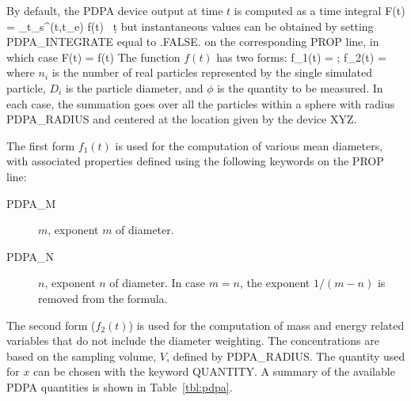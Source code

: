 \documentclass[11pt]{book}
\begin{document}
By default, the PDPA device output at time $t$ is computed as a time integral
\be
F(t) =  \int_{t_{\rm s}}^{\min(t,t_{\rm e})} f(t) \, \d t
\ee
but instantaneous values can be obtained by setting {\ct PDPA\_INTEGRATE} equal to {\ct .FALSE.} on the corresponding {\ct PROP} line, in which case
\be
F(t) = f(t)
\ee
The function $f(t)$ has two forms:
\be
f_1(t) =    \quad ; \quad
f_2(t) = 
\ee
where $n_i$ is the number of real particles represented by the single simulated particle, $D_i$
is the particle diameter, and $\phi$ is the quantity to be measured. In each case, the summation goes over all the particles within a sphere
with radius {\ct PDPA\_RADIUS} and centered at the location given by the device {\ct XYZ}.

The first form $f_1(t)$ is used for the computation of various mean diameters, with
associated properties defined using the following keywords on the {\ct PROP} line:
\begin{description}
\item[{\ct PDPA\_M}] $m$, exponent $m$ of diameter.
\item[{\ct PDPA\_N}] $n$, exponent $n$ of diameter. In case $m=n$, the exponent $1/(m-n)$ is removed from the formula.
\end{description}
The second form ($f_2(t)$) is used for the computation of mass and energy related variables that do not include the diameter weighting.
The concentrations are based on the sampling volume, $V$, defined by {\ct PDPA\_RADIUS}.
The quantity used for $x$ can be chosen with the keyword {\ct QUANTITY}.
A summary of the available PDPA quantities is shown in Table~\ref{tbl:pdpa}.
\end{document}

